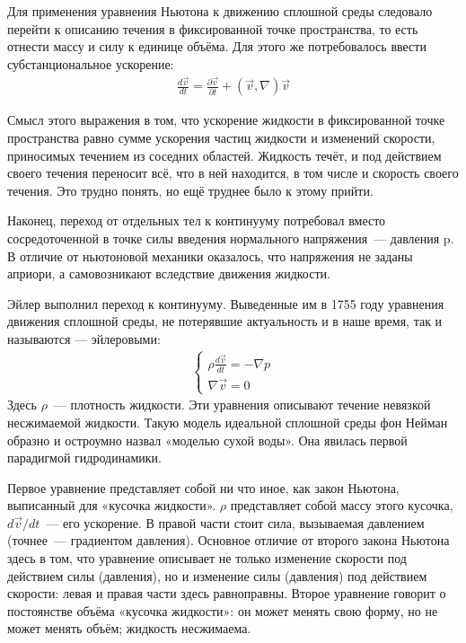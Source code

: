Для применения уравнения Ньютона к движению сплошной среды следовало перейти к описанию течения в фиксированной 
точке пространства, то есть отнести массу и силу к единице объёма. Для этого же потребовалось ввести 
субстанциональное ускорение:
\begin{gather}
\frac{d \vec v}{d t} = \frac{\partial \vec v}{\partial t} + (\vec v, \nabla) \vec v
\label{2}
\end{gather}

Смысл этого выражения в том, что ускорение жидкости в фиксированной точке пространства равно сумме ускорения 
частиц жидкости и изменений скорости, приносимых течением из соседних областей. Жидкость течёт, и под 
действием своего течения переносит всё, что в ней находится, в том числе и скорость своего течения. Это 
трудно понять, но ещё труднее было к этому прийти.

Наконец, переход от отдельных тел к континууму потребовал вместо сосредоточенной в точке силы введения 
нормального напряжения~--- давления p. В отличие от ньютоновой механики оказалось, что напряжения не заданы 
априори, а самовозникают вследствие движения жидкости.

Эйлер выполнил переход к континууму. Выведенные им в 1755 году уравнения движения сплошной среды, не 
потерявшие актуальность и в наше время, так и называются — эйлеровыми:
\begin{gather}
\begin{cases}
\rho \frac{d \vec v}{d t} = - \nabla p \\
\nabla \vec v = 0
\end{cases}
\label{3}
\end{gather}
Здесь $\rho$~--- плотность жидкости. Эти уравнения описывают течение невязкой несжимаемой жидкости. 
Такую модель идеальной сплошной среды фон Нейман образно и остроумно назвал «моделью сухой воды». Она явилась
 первой парадигмой гидродинамики.

Первое уравнение представляет собой ни что иное, как закон Ньютона, выписанный для «кусочка жидкости». $\rho$ 
представляет собой массу этого кусочка, $ d \vec{v} / dt$~--- его ускорение. В правой части стоит сила, 
вызываемая давлением (точнее~--- градиентом давления). Основное отличие от второго закона Ньютона здесь в том,
что уравнение описывает не только изменение скорости под действием силы (давления), но и изменение силы (давления)
под действием скорости: левая и правая части здесь равноправны. Второе уравнение говорит о постоянстве объёма
 «кусочка жидкости»: он может менять свою форму, но не может менять объём; жидкость несжимаема.

